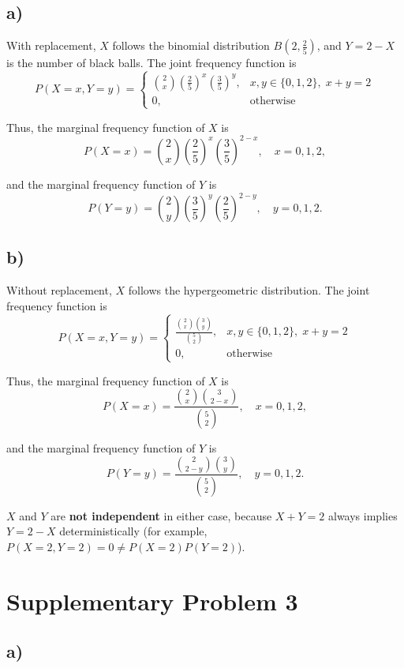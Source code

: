 \documentclass[a4paper, UTF-8]{article}
\theoremstyle{plain}
\begin{document}
\subsection{a)}

With replacement, $X$ follows the binomial distribution $B(2, \frac{2}{5})$, and $Y = 2 - X$ is the number of black balls. The joint frequency function is
$$
P(X = x, Y = y) = \begin{cases}
\displaystyle \binom{2}{x}\left(\frac{2}{5}\right)^{x}\left(\frac{3}{5}\right)^{y}, & x, y \in \{0, 1, 2\},\; x + y = 2 \\[8pt]
0, & \text{otherwise}
\end{cases}
$$

Thus, the marginal frequency function of $X$ is
$$
P(X = x) = \binom{2}{x}\left(\frac{2}{5}\right)^{x}\left(\frac{3}{5}\right)^{2 - x}, \quad x = 0, 1, 2,
$$

and the marginal frequency function of $Y$ is
$$
P(Y = y) = \binom{2}{y}\left(\frac{3}{5}\right)^{y}\left(\frac{2}{5}\right)^{2 - y}, \quad y = 0, 1, 2.
$$

\subsection{b)}

Without replacement, $X$ follows the hypergeometric distribution. The joint frequency function is
$$
P(X = x, Y = y) = \begin{cases}
\displaystyle \frac{\binom{2}{x}\binom{3}{y}}{\binom{5}{2}}, & x, y \in \{0, 1, 2\},\; x + y = 2 \\[8pt]
0, & \text{otherwise}
\end{cases}
$$

Thus, the marginal frequency function of $X$ is
$$
P(X = x) = \frac{\binom{2}{x}\binom{3}{2 - x}}{\binom{5}{2}}, \quad x = 0, 1, 2,
$$

and the marginal frequency function of $Y$ is
$$
P(Y = y) = \frac{\binom{2}{2 - y}\binom{3}{y}}{\binom{5}{2}}, \quad y = 0, 1, 2.
$$

$X$ and $Y$ are \textbf{not independent} in either case, because $X + Y = 2$ always implies $Y = 2 - X$ deterministically (for example, $P(X = 2, Y = 2) = 0 \neq P(X = 2)P(Y = 2)$).

\section{Supplementary Problem 3}

\subsection{a)} 
\end{document}
